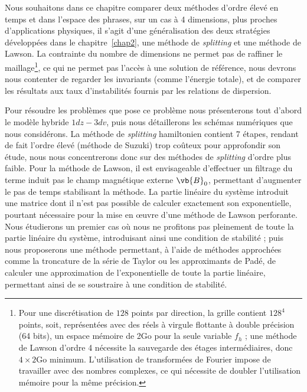 Nous souhaitons dans ce chapitre comparer deux méthodes d'ordre élevé en temps et dans l'espace des phrases, sur un cas à 4 dimensions, plus proches d'applications physiques, il s'agit d'une généralisation des deux stratégies développées dans le chapitre~\ref{chap2}, une méthode de \emph{splitting} et une méthode de Lawson. La contrainte du nombre de dimensions ne permet pas de raffiner le maillage\footnote{Pour une discrétisation de $128$ points par direction, la grille contient $128^4$ points, soit, représentées avec des réels à virgule flottante à double précision (64 bits), un espace mémoire de 2Go pour la seule variable $f_h$ ; une méthode de Lawson d'ordre 4 nécessite la sauvegarde des étages intermédiaires, donc $4\times 2\textrm{Go}$ minimum. L'utilisation de transformées de Fourier impose de travailler avec des nombres complexes, ce qui nécessite de doubler l'utilisation mémoire pour la même précision.}, ce qui ne permet pas l'accès à une solution de référence, nous devrons nous contenter de regarder les invariants (comme l'énergie totale), et de comparer les résultats aux taux d'instabilités fournis par les relations de dispersion.

Pour résoudre les problèmes que pose ce problème nous présenterons tout d'abord le modèle hybride $1dz-3dv$, puis nous détaillerons les schémas numériques que nous considérons. La méthode de \emph{splitting} hamiltonien contient 7 étapes, rendant de fait l'ordre élevé (méthode de Suzuki) trop coûteux pour approfondir son étude, nous nous concentrerons donc sur des méthodes de \emph{splitting} d'ordre plus faible. Pour la méthode de Lawson, il est envisageable d'effectuer un filtrage du terme induit pas le champ magnétique externe $\vb{B}_0$, permettant d'augmenter le pas de temps stabilisant la méthode. La partie linéaire du système introduit une matrice dont il n'est pas possible de calculer exactement son exponentielle, pourtant nécessaire pour la mise en œuvre d'une méthode de Lawson perforante. Nous étudierons un premier cas où nous ne profitons pas pleinement de toute la partie linéaire du système, introduisant ainsi une condition de stabilité ; puis nous proposerons une méthode permettant, à l'aide de méthodes approchées comme la troncature de la série de Taylor ou les approximants de Padé, de calculer une approximation de l'exponentielle de toute la partie linéaire, permettant ainsi de se soustraire à une condition de stabilité. 
